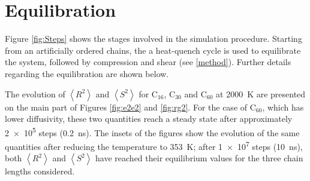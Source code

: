 \documentclass[5p]{elsarticle}
\begin{document}


\section{Equilibration}

Figure \ref{fig:Steps} shows the stages involved in the simulation procedure. Starting from an artificially ordered chains, the a heat-quench cycle is used to equilibrate the system, followed by compression and shear (see \ref{method}). Further details regarding the equilibration are shown below.

The evolution of $\left< R^2 \right>$ and $\left< S^2 \right>$ for C$_{16}$, C$_{30}$ and C$_{60}$ at \SI{2000}{\kelvin} are presented on the main part of Figures \ref{fig:e2e2} and \ref{fig:rg2}. For the case of C$_{60}$, which has lower diffusivity, these two quantities reach a steady state after approximately \SI{2e5}{} steps (\SI{0.2}{\nano\second}). The insets of the figures show the evolution of the same quantities after reducing the temperature to \SI{353}{\kelvin}; after \SI{1e7}{} steps (\SI{10}{\nano\second}), both $\left< R^2 \right>$ and $\left< S^2 \right>$ have reached their equilibrium values for the three chain lengths considered.
\end{document}
